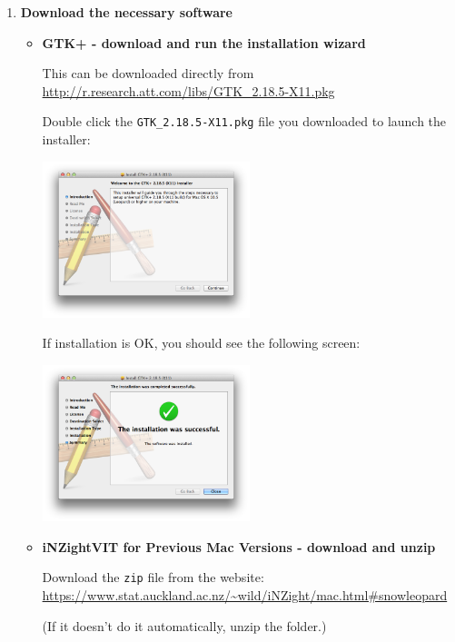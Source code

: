 \documentclass[10pt,a4paper,twoside]{article}
\begin{document}
\begin{enumerate}
\item \textbf{Download the necessary software}
  \begin{itemize}

  \item \textbf{GTK+ - download and run the installation wizard}

    This can be downloaded directly from\\ 
    \url{http://r.research.att.com/libs/GTK_2.18.5-X11.pkg}

    Double click the \verb+GTK_2.18.5-X11.pkg+ file you downloaded to launch the installer:
    \begin{center}
      \includegraphics[width=0.5\textwidth]{fig/mountain-lion/s1-a.png}
    \end{center}
    
    If installation is OK, you should see the following screen:
    \begin{center}
      \includegraphics[width=0.5\textwidth]{fig/mountain-lion/s1-b.png}
    \end{center}

  \item \textbf{iNZightVIT for Previous Mac Versions - download and unzip}
    
    Download the \verb+zip+ file from the website:\\
    \url{https://www.stat.auckland.ac.nz/~wild/iNZight/mac.html#snowleopard}

    (If it doesn't do it automatically, unzip the folder.)
  \end{itemize}


\end{enumerate}
\end{document}

